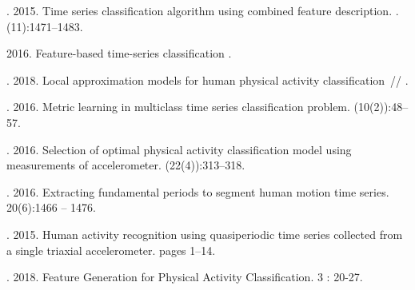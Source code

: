 \documentclass[12pt, twoside]{article}
\begin{document}
\begin{thebibliography}{99}
	
 	
\end{thebibliography}

\maketitleSecondary
\English
\begin{thebibliography}{99}

	. 2015.
	 Time series classification algorithm using combined feature description. .
	 (11):1471–1483.

	 2016.
	Feature-based time-series classification
	.
	
	. 2018.
	Local approximation models for human physical activity classification~//
	.

	. 2016.
	 Metric learning in multiclass time series classification problem.
	 (10(2)):48–57.

	. 2016.
	 Selection of optimal physical activity classification model using measurements of accelerometer.
	  (22(4)):313–318.

	. 2016.
	 Extracting fundamental periods to segment human motion time series.
	  20(6):1466 – 1476.

	. 2015.
	 Human activity recognition using quasiperiodic time series collected from a single triaxial accelerometer.
	  pages 1–14.
	
	. 2018.
	Feature Generation for Physical Activity Classification.
	  3 : 20-27.


\end{thebibliography}
\end{document}
